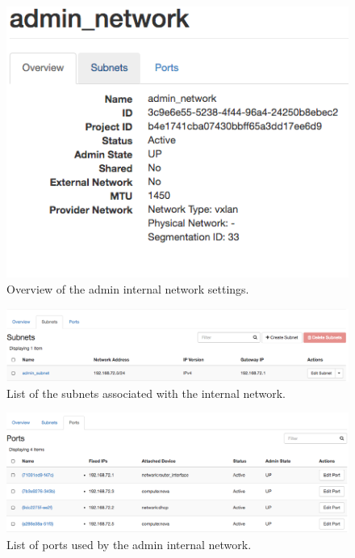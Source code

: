 \begin{figure}[H]
  \centering
  \includegraphics[scale=0.5]{img/network-adminnet-overview}
  \caption{Overview of the admin internal network settings.}
  \label{fig:int-overview}
\end{figure}

\begin{figure}[H]
  \centering
  \includegraphics[scale=0.40]{img/network-adminnet-subnets}
  \caption{List of the subnets associated with the internal network.}
  \label{fig:int-subnets}
\end{figure}

\begin{figure}[H]
  \centering
  \includegraphics[scale=0.40]{img/network-adminnet-ports}
  \caption{List of ports used by the admin internal network.}
  \label{fig:int-ports}
\end{figure}

